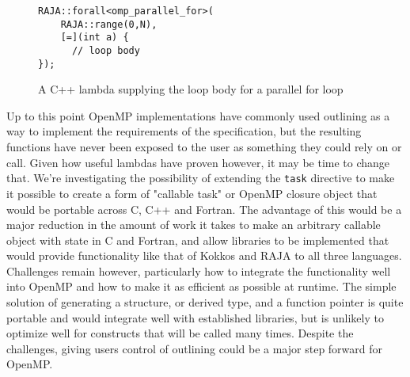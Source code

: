 \begin{figure}
\begin{verbatim}
RAJA::forall<omp_parallel_for>(
    RAJA::range(0,N),
    [=](int a) {
      // loop body
});
\end{verbatim}
\caption{A C++ lambda supplying the loop body for a parallel for loop}
\label{fig:raja}
\end{figure}
   
Up to this point OpenMP implementations have commonly used outlining as a way to
implement the requirements of the specification, but the resulting functions
have never been exposed to the user as something they could rely on or call.
Given how useful lambdas have proven however, it may be time to change that.
We're investigating the possibility of extending the \texttt{task} directive to
make it possible to create a form of "callable task" or OpenMP closure object
that would be portable across C, C++ and Fortran.  The advantage of this would
be a major reduction in the amount of work it takes to make an arbitrary
callable object with state in C and Fortran, and allow libraries to be
implemented that would provide functionality like that of Kokkos and RAJA to all
three languages.  Challenges remain however, particularly how to integrate the
functionality well into OpenMP and how to make it as efficient as possible at
runtime.  The simple solution of generating a structure, or derived type, and
a function pointer is quite portable and would integrate well with established
libraries, but is unlikely to optimize well for constructs that will be called
many times.  Despite the challenges, giving users control of outlining could be
a major step forward for OpenMP.


